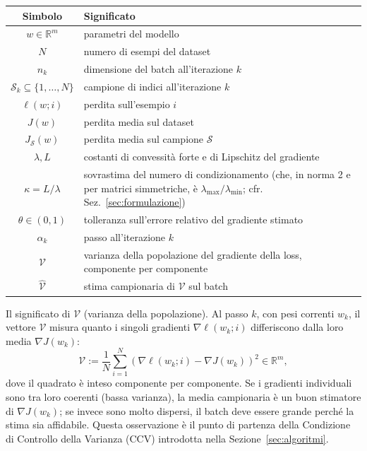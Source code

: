 \documentclass[a4paper,12pt]{article}
\numberwithin{equation}{section}
\numberwithin{figure}{section}
\numberwithin{table}{section}
\newcommand{\R}{\mathbb{R}}
\begin{document}
\begin{center}
\renewcommand{\arraystretch}{1.4}
\begin{tabular}{>{\bfseries}c p{}}
\toprule
Simbolo & Significato \\
\midrule
$w \in \R^m$ & parametri del modello \\
$N$ & numero di esempi del dataset \\
$n_k$ & dimensione del batch all'iterazione $k$ \\
$\mathcal{S}_k \subseteq \{1,\dots,N\}$ & campione di indici all'iterazione $k$ \\
$\ell(w; i)$ & perdita sull'esempio $i$ \\
$J(w)$ & perdita media sul dataset \\
$J_{\mathcal{S}}(w)$ & perdita media sul campione $\mathcal{S}$ \\
$\lambda, L$ & costanti di convessità forte e di Lipschitz del gradiente \\
$\kappa = L/\lambda$ & sovrastima del numero di condizionamento (che, in norma 2 e per matrici simmetriche, è $\lambda_{\max}/\lambda_{\min}$; cfr. Sez.~\ref{sec:formulazione}) \\
$\theta \in (0,1)$ & tolleranza sull'errore relativo del gradiente stimato \\
$\alpha_k$ & passo all'iterazione $k$ \\
$\mathcal{V}$ & varianza della popolazione del gradiente della loss, componente per componente \\
$\widehat{\mathcal{V}}$ & stima campionaria di $\mathcal{V}$ sul batch \\
\bottomrule
\end{tabular}
\end{center}

\begin{notebox}
  Il significato di $\mathcal{V}$ (varianza della popolazione).
  Al passo $k$, con pesi correnti $w_k$, il vettore $\mathcal{V}$ misura
  quanto i singoli gradienti $\nabla \ell(w_k; i)$ differiscono dalla loro
  media $\nabla J(w_k)$:
  \[
  \mathcal{V} := \frac{1}{N} \sum_{i=1}^{N}
  \left( \nabla \ell(w_k; i) - \nabla J(w_k) \right)^2 \in \mathbb{R}^m,
  \]
  dove il quadrato è inteso componente per componente. Se i gradienti
  individuali sono tra loro coerenti (bassa varianza), la media campionaria è
  un buon stimatore di $\nabla J(w_k)$; se invece sono molto dispersi, il
  batch deve essere grande perché la stima sia affidabile. Questa osservazione
  è il punto di partenza della Condizione di Controllo della Varianza
  (CCV) introdotta nella Sezione~\ref{sec:algoritmi}.
\end{notebox}
\end{document}
